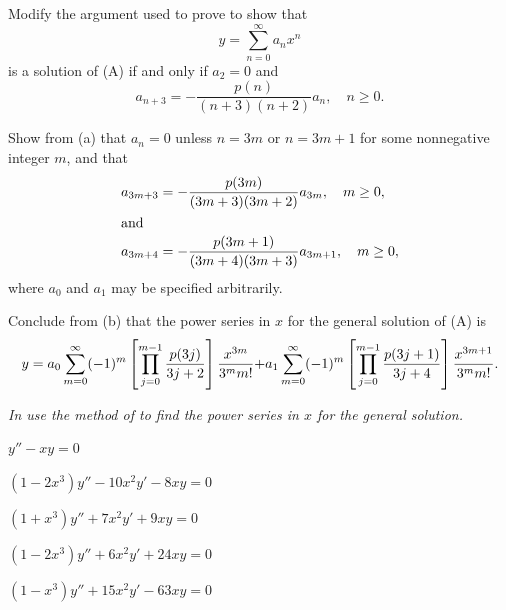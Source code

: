 \begin{exerciselist}
\begin{alist}
\item %
 Modify the argument used to prove 
to show that
\[
y=\sum_{n=0}^\infty a_nx^n
\]
  is a solution of
(A)  if and only if  $a_2=0$  and
\[
a_{n+3}=-\frac{p(n)}{(n+3)(n+2)}a_n,\quad n\ge0.
\]
\item %
Show from (a)  that $a_n=0$  unless $n=3m$  or $n=3m+1$
for some nonnegative integer $m$, and that
\begin{align*}
a_{3m+3}&=-\frac{p(3m)}{(3m+3)(3m+2)}a_{3m},\quad m\ge0,\\
\shortintertext{and}
a_{3m+4}&=-\frac{p(3m+1)}{(3m+4)(3m+3)}a_{3m+1},\quad m\ge0,
\end{align*}
where $a_0$ and $a_1$ may be specified arbitrarily.
\item %
Conclude from (b)  that the  power series in $x$ for the general
solution
of (A)  is
\[
y=\displaystyle{a_0\sum^\infty_{m=0}(-1)^m \left[\prod^{m-1}_{j=0}
\frac{p(3j)}{3j+2}\right]\frac{x^{3m}}{3^m m!}}
\displaystyle{+a_1\sum^\infty_{m=0}(-1)^m
\left[\prod^{m-1}_{j=0}\frac{p(3j+1)}{3j+4}\right]
\frac{x^{3m+1}}{3^mm!}}.
\]
\end{alist}
\end{exerciselist}
%
\textsl{In   use the method of
  to find the power series in
$x$ for the general solution.}

\begin{exerciselistTwoColumn}
\item\label{exer:7.2.33}$y''-xy=0$
\item\label{exer:7.2.34}$(1-2x^3)y''-10x^2y'-8xy=0$
\item\label{exer:7.2.35}$(1+x^3)y''+7x^2y'+9xy=0$
\item\label{exer:7.2.36}$(1-2x^3)y''+6x^2y'+24xy=0$
\item\label{exer:7.2.37}$(1-x^3)y''+15x^2y'-63xy=0$
\end{exerciselistTwoColumn}

